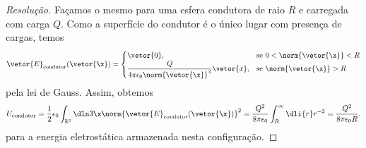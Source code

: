 \begin{proof}[Resolução]
    Façamos o mesmo para uma esfera condutora de raio \(R\) e carregada com carga \(Q\). Como a superfície do condutor é o único lugar com presença de cargas, temos
    \begin{equation*}
        \vetor{E}_\mathrm{condutor}(\vetor{\x}) = \begin{cases}
            \vetor{0},&\text{se }0 < \norm{\vetor{\x}} < R\\
            \dfrac{Q}{4\pi \epsilon_0 \norm{\vetor{\x}}^3}\vetor{x},&\text{se }\norm{\vetor{\x}} > R
        \end{cases}
    \end{equation*}
    pela lei de Gauss. Assim, obtemos
    \begin{equation*}
        U_\mathrm{condutor} = \frac12 \epsilon_0 \int_{\mathbb{R}^3}\dln3\x \norm{\vetor{E}_\mathrm{condutor}(\vetor{\x})}^2 = \frac{Q^2}{8\pi \epsilon_0} \int_R^\infty \dli{r} r^{-2} = \frac{Q^2}{8\pi \epsilon_0 R}.
   \end{equation*}
   para a energia eletrostática armazenada nesta configuração.
\end{proof}

